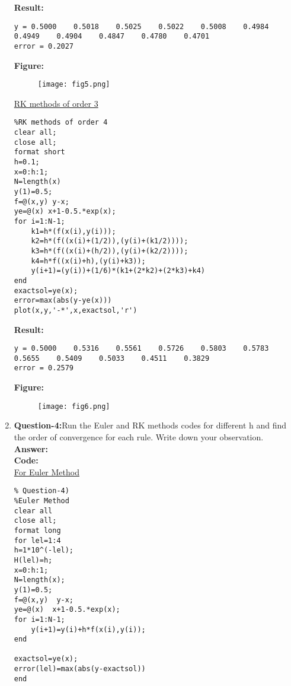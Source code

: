 \documentclass{article}
\begin{document}
\begin{enumerate}
\begin{lstlisting}
\end{lstlisting}
\textbf{Result:}
\begin{lstlisting}
y = 0.5000    0.5018    0.5025    0.5022    0.5008    0.4984    0.4949    0.4904    0.4847    0.4780    0.4701
error = 0.2027
\end{lstlisting}
\textbf{Figure:}
\begin{figure}[H]                                 
	  \centering                          
	  \texttt{[image: fig5.png]}
\caption{}
\label{fig:1.1}                        
  \end{figure}

  \underline{RK methods of order 3}
\begin{lstlisting}
%RK methods of order 4
clear all;
close all;
format short 
h=0.1;
x=0:h:1;
N=length(x)
y(1)=0.5;
f=@(x,y) y-x;
ye=@(x) x+1-0.5.*exp(x);
for i=1:N-1;
    k1=h*(f(x(i),y(i)));
    k2=h*(f((x(i)+(1/2)),(y(i)+(k1/2))));
    k3=h*(f((x(i)+(h/2)),(y(i)+(k2/2))));
    k4=h*f((x(i)+h),(y(i)+k3));
    y(i+1)=(y(i))+(1/6)*(k1+(2*k2)+(2*k3)+k4)
end
exactsol=ye(x);
error=max(abs(y-ye(x)))
plot(x,y,'-*',x,exactsol,'r')

\end{lstlisting}
\textbf{Result:}
\begin{lstlisting}
y = 0.5000    0.5316    0.5561    0.5726    0.5803    0.5783    0.5655    0.5409    0.5033    0.4511    0.3829
error = 0.2579
\end{lstlisting}
\textbf{Figure:}
\begin{figure}[H]                                 
	  \centering                          
	  \texttt{[image: fig6.png]}
\caption{}
\label{fig:1.1}                        
  \end{figure}
\item \textbf{Question-4:}Run the Euler and RK methods codes for different h and find the order of convergence for
each rule. Write down your observation.\\
\textbf{Answer:}\\
\textbf{Code:}\\
\underline{For Euler Method}
\begin{lstlisting}
% Question-4)
%Euler Method
clear all
close all;
format long
for lel=1:4
h=1*10^(-lel);
H(lel)=h;
x=0:h:1;
N=length(x);
y(1)=0.5; 
f=@(x,y)  y-x;
ye=@(x)  x+1-0.5.*exp(x);
for i=1:N-1;
    y(i+1)=y(i)+h*f(x(i),y(i));
end

exactsol=ye(x);
error(lel)=max(abs(y-exactsol))
end


\end{lstlisting}
\end{enumerate}
\end{document}
